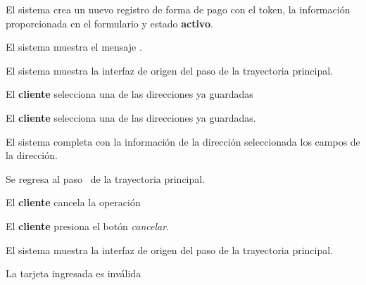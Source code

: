 {\begin{trayectoriaPrincipal}
    \item El sistema crea un nuevo registro de forma de pago con el token, la
      información proporcionada en el formulario y estado \textbf{activo}.

    \item El sistema muestra el mensaje
      .

    \item El sistema muestra la interfaz de origen del paso
       de la trayectoria principal.

  \end{trayectoriaPrincipal}


  \begin{trayectoriaAlternativa}
    {El \textbf{cliente} selecciona una de las direcciones ya guardadas}

    \item El \textbf{cliente} selecciona una de las direcciones ya
      guardadas.

    \item El sistema completa con la información de la dirección seleccionada
      los campos de la dirección.

    \item Se regresa al paso~ de la trayectoria
      principal.

  \end{trayectoriaAlternativa}


  \begin{trayectoriaAlternativa}
    {El \textbf{cliente} cancela la operación}

    \item El \textbf{cliente} presiona el botón \textit{cancelar}.

    \item El sistema muestra la interfaz de origen del paso
       de la trayectoria principal.

  \end{trayectoriaAlternativa}


  \begin{trayectoriaAlternativa}
    {La tarjeta ingresada es inválida}


\end{trayectoriaAlternativa}}
